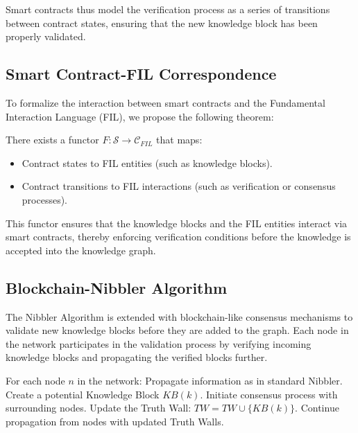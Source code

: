 Smart contracts thus model the verification process as a series of transitions between contract states, ensuring that the new knowledge block has been properly validated.

\subsection{Smart Contract-FIL Correspondence}
To formalize the interaction between smart contracts and the Fundamental Interaction Language (FIL), we propose the following theorem:

\begin{theorem}
There exists a functor $F: \mathcal{S} \rightarrow \mathcal{C}_{FIL}$ that maps:
\begin{itemize}
    \item Contract states to FIL entities (such as knowledge blocks).
    \item Contract transitions to FIL interactions (such as verification or consensus processes).
\end{itemize}
\end{theorem}

This functor ensures that the knowledge blocks and the FIL entities interact via smart contracts, thereby enforcing verification conditions before the knowledge is accepted into the knowledge graph.

\subsection{Blockchain-Nibbler Algorithm}
The Nibbler Algorithm is extended with blockchain-like consensus mechanisms to validate new knowledge blocks before they are added to the graph. Each node in the network participates in the validation process by verifying incoming knowledge blocks and propagating the verified blocks further.


\begin{algorithmic}[1]
   \State For each node $n$ in the network:
   \State Propagate information as in standard Nibbler.
       \State Create a potential Knowledge Block $KB(k)$.
       \State Initiate consensus process with surrounding nodes.
           \State Update the Truth Wall: $TW = TW \cup \{KB(k)\}$.
       \EndIf
   \EndIf
   \State Continue propagation from nodes with updated Truth Walls.
\end{algorithmic}


